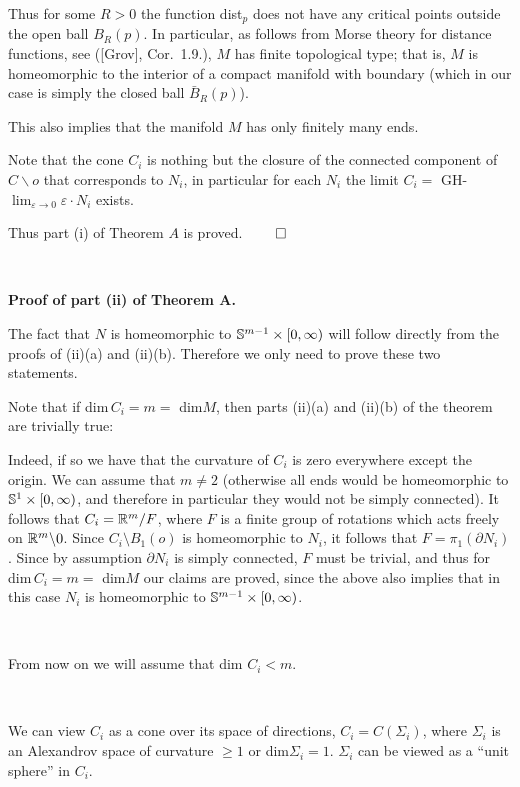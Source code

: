 Thus for some $R>0$ the function
dist$_p$ does not have any critical points outside the open ball $B_R(p)$.
In particular, as follows from Morse theory for distance 
functions, see ([Grov], Cor.~1.9.), $M$ has finite topological type;
that is, $M$ is homeomorphic to the interior of a compact manifold with
boundary (which in our case is simply the closed ball $\bar B_R(p)$).

This also implies that the manifold $M$ has only finitely many ends.


Note that the cone $C_i$ is nothing but the closure of the connected component 
of
$C\backslash o$ that corresponds to $N_i$, 
in particular
for each $N_i$ the limit $C_i=$
GH-$\lim_{\varepsilon\to 0} \varepsilon{\cdot} N_i$ exists. 
 






Thus part (i) of Theorem $A$ is proved. $\qed$ 
 
 
\ 
 
\noindent
{\bf Proof of part (ii) of Theorem A.}

The fact that $N$ is homeomorphic to ${\Bbb S}^{m-1}\times [0,\infty)$ will follow
directly from the proofs of (ii)(a) and (ii)(b). 
Therefore we only need to prove these two statements.

Note that if dim\,$C_i=m=$ dim$M$, then parts (ii)(a) and (ii)(b) 
of the theorem are trivially true: 
 
Indeed, if so we have that the curvature of $C_i$ is zero everywhere except the 
origin.
We can assume that  $m\not=2$ (otherwise all ends would be homeomorphic to    
${\Bbb S}^1\times [0,\infty)$, and therefore in particular 
they would not be simply connected).
It 
follows that $C_i={\Bbb R}^m/F$,
where $F$ is a finite group of rotations which acts freely
on ${\Bbb R}^m\backslash 0$.
Since $C_i \setminus B_1(o)$ is homeomorphic to $N_i$,
it follows that $F=\pi_1 (\partial N_i)$.
Since by assumption $\partial N_i$ is simply connected, $F$ must be trivial,
and thus for dim\,$C_i=m=$ dim$M$ our claims are proved,
since the above also implies that 
in this case $N_i$ is homeomorphic to 
${\Bbb S}^{m-1}\times [0,\infty)$.
 
\ 


 
From now on we will assume that dim $C_i<m$. 
 
\ 

We can view $C_i$ as a cone over its space of directions, 
$C_i=C(\Sigma_i)$, where $\Sigma_i$ is an Alexandrov space 
of curvature $\ge 1$ or dim$\Sigma_i=1$. $\Sigma_i$ can be viewed as a  
``unit sphere'' in $C_i$.  

